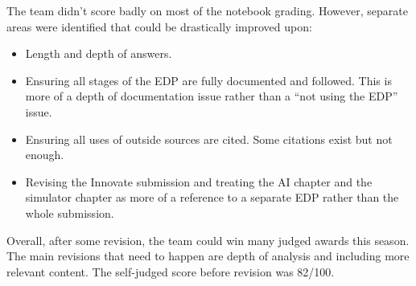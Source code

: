The team didn’t score badly on most of the notebook grading. However, separate areas were identified that could be drastically improved upon:
\begin{itemize}
    \item Length and depth of answers.
    \item Ensuring all stages of the EDP are fully documented and followed. This is more of a depth of documentation issue rather than a “not using the EDP” issue.
    \item Ensuring all uses of outside sources are cited. Some citations exist but not enough.
    \item Revising the Innovate submission and treating the AI chapter and the simulator chapter as more of a reference to a separate EDP rather than the whole submission.
\end{itemize}

Overall, after some revision, the team could win many judged awards this season. The main revisions that need to happen are depth of analysis and including more relevant content. The self-judged score before revision was 82/100.
